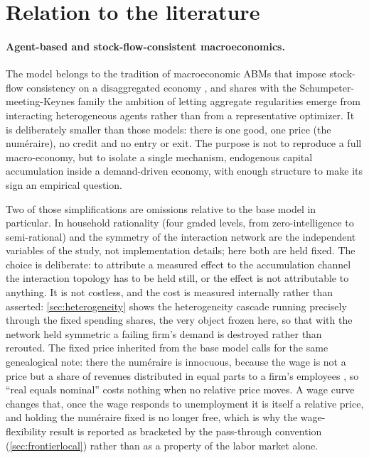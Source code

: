
\section{Relation to the literature}
\label{sec:literature}

\paragraph{Agent-based and stock-flow-consistent macroeconomics.}
The model belongs to the tradition of macroeconomic ABMs that impose stock-flow consistency on a disaggregated economy \citep{GodleyLavoie2007,Caiani2016}, and shares with the Schumpeter-meeting-Keynes family \citep{Dosi2010} the ambition of letting aggregate regularities emerge from interacting heterogeneous agents rather than from a representative optimizer.
It is deliberately smaller than those models: there is one good, one price (the numéraire), no credit and no entry or exit. The purpose is not to reproduce a full macro-economy, but to isolate a single mechanism, endogenous capital accumulation inside a demand-driven economy, with enough structure to make its sign an empirical question.

Two of those simplifications are omissions relative to the base model in particular. In \citet{Teglio2025} household rationality (four graded levels, from zero-intelligence to semi-rational) and the symmetry of the interaction network are the independent variables of the study, not implementation details; here both are held fixed. The choice is deliberate: to attribute a measured effect to the accumulation channel the interaction topology has to be held still, or the effect is not attributable to anything. It is not costless, and the cost is measured internally rather than asserted: \cref{sec:heterogeneity} shows the heterogeneity cascade running precisely through the fixed spending shares, the very object frozen here, so that with the network held symmetric a failing firm's demand is destroyed rather than rerouted. The fixed price inherited from the base model calls for the same genealogical note: there the numéraire is innocuous, because the wage is not a price but a share of revenues distributed in equal parts to a firm's employees \citep{Teglio2025}, so ``real equals nominal'' costs nothing when no relative price moves. A wage curve changes that, once the wage responds to unemployment it is itself a relative price, and holding the numéraire fixed is no longer free, which is why the wage-flexibility result is reported as bracketed by the pass-through convention (\cref{sec:frontierlocal}) rather than as a property of the labor market alone.

